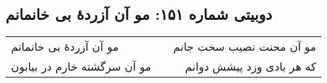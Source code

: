 \begin{center}
\section*{دوبیتی شماره ۱۵۱: مو آن آزردهٔ بی خانمانم}
\label{sec:151}
\begin{longtable}{l p{0.5cm} r}
مو آن آزردهٔ بی خانمانم
&&
مو آن محنت نصیب سخت جانم
\\
مو آن سرگشته خارم در بیابون
&&
که هر بادی وزد پیشش دوانم
\\
\end{longtable}
\end{center}
